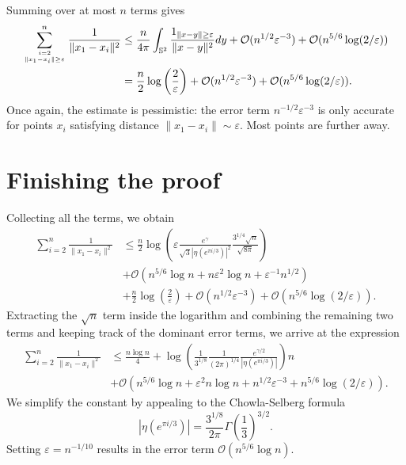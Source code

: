 \documentclass[10pt, reqno]{amsart}
\begin{document}
Summing over at most $n$ terms gives 
\begin{align*}
 \sum_{i=2 \atop \|x_1 - x_i\| \geq \varepsilon}^{n} \frac{1}{\|x_1 - x_i\|^2} &\leq  \frac{n}{4\pi}  \int_{\mathbb{S}^2} \frac{1_{\|x-y\| \geq \varepsilon}}{\|x-y\|^2} dy + \mathcal{O}(n^{1/2} \varepsilon^{-3}) + \mathcal{O}(n^{5/6} \log(2/\varepsilon)) \\
 &= \frac{n}{2} \log\left( \frac{2}{\varepsilon} \right) + \mathcal{O}(n^{1/2} \varepsilon^{-3}) + \mathcal{O}(n^{5/6} \log(2/\varepsilon)).
 \end{align*}
Once again, the estimate is pessimistic: the error term $n^{-1/2} \varepsilon^{-3}$ is only accurate for points $x_i$ satisfying
 distance $\|x_1- x_i\| \sim \varepsilon$. Most points are further away.
 
 \section{Finishing the proof}
 Collecting all the terms, we obtain
 \begin{align*}
 \sum_{i=2}^{n} \frac{1}{\|x_1 - x_i\|^2} &\leq   \frac{n}{2} \log\left(\varepsilon \frac{e^{\gamma}}{\sqrt{3} |\eta(e^{\pi i/3})|^2}  \frac{ 3^{1/4} \sqrt{n}}{ \sqrt{8 \pi}}\right) \\
  &+ \mathcal{O}(n^{5/6} \log{n} + n \varepsilon^2 \log{n} + \varepsilon^{-1} n^{1/2}) \\
  &+ \frac{n}{2} \log\left( \frac{2}{\varepsilon} \right) + \mathcal{O}(n^{1/2} \varepsilon^{-3}) + \mathcal{O}(n^{5/6} \log(2/\varepsilon)).
 \end{align*}
 Extracting the $\sqrt{n}$ term inside the logarithm and combining the remaining two terms and keeping track of the dominant error terms, we arrive at the expression
  \begin{align*}
 \sum_{i=2}^{n} \frac{1}{\|x_1 - x_i\|^2} &\leq \frac{n \log{n}}{4} +    \log\left(  \frac{1}{3^{1/8}} \frac{ 1}{ (2 \pi)^{1/4}} \frac{e^{\gamma/2}}{  |\eta(e^{\pi i/3})|}   \right) n \\
  &  + \mathcal{O}(n^{5/6} \log{n} + \varepsilon^2 n \log{n} + n^{1/2} \varepsilon^{-3}+ n^{5/6} \log(2/\varepsilon)).
 \end{align*}
 We simplify the constant by appealing to the Chowla-Selberg formula \cite{chowla, chowla2} 
 $$  |\eta(e^{\pi i/3})| = \frac{3^{1/8}}{2\pi} \Gamma \left( \frac{1}{3} \right)^{3/2}.$$
Setting $\varepsilon = n^{-1/10}$ results in the error term $\mathcal{O}(n^{5/6} \log{n})$.
\end{document}
